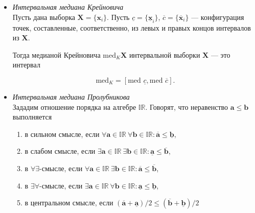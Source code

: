 \documentclass[10pt]{article}
\begin{document}
\begin{itemize}
  \[
    \mathbf{X} = \{ \mathbf{x}_i \}.
  \]

  Сформируем массив интервалов \( \mathbf{z} \) из концов интервалов
  \( \mathbf{X} \).

  Для каждого интервала \( \mathbf{z}_i \) подсчитываем число \( \mu_i \)
  интервалов из выборки \( \mathbf{X}_i \), включающих \( \mathbf{z}_i \).
  Максимальные \( \mu_i = \max \mu \) достигаются для индексного множества
  \( K \). Тогда можно найти интервальную моду как мультиинтервал

  \begin{equation*}
    \text{mode } \mathbf{X} = \bigcup_{k \in K} \mathbf{z}_k.
  \end{equation*}
  
 \item \textit{Интервальная медиана Крейновича}\\
   Пусть дана выборка \( \mathbf{X} = \{ \mathbf{x}_i \} \). Пусть
  \( \underline c = \{ \underline{\mathbf{x}}_i \} \),
  \( \overline c = \{ \overline{\mathbf{x}}_i \} \) --- конфигурация
  точек, составленные, соответственно, из левых и правых концов интервалов
  из \( \mathbf{X} \).

  Тогда медианой Крейновича \( \text{med}_K \mathbf{X} \) интервальной
  выборки \( \mathbf{X} \) --- это интервал

  \begin{equation*}
    \text{med}_K = [\text{med } \underline c, \text{med } \overline c].
  \end{equation*}
  
 \item \textit{Интервальная медиана Пролубникова}\\
    Зададим отношение порядка на алгебре \( \mathbb{IR} \). Говорят, что
  неравенство \( \mathbf{a} \leqslant \mathbf{b} \) выполняется

  \begin{enumerate}
    \item в сильном смысле, если
      \( \forall \mathbf{a} \in \mathbb{IR} \ \forall \mathbf{b} \in \mathbb{IR}: \overline{\mathbf{a}} \leqslant \underline{\mathbf{b}} \),
    \item в слабом смысле, если
      \( \exists \mathbf{a} \in \mathbb{IR} \ \exists \mathbf{b} \in \mathbb{IR}: \underline{\mathbf{a}} \leqslant \overline{\mathbf{b}} \),
    \item в \( \forall \exists \)-смысле, если
      \( \forall \mathbf{a} \in \mathbb{IR} \ \exists \mathbf{b} \in \mathbb{IR}: \overline{\mathbf{a}} \leqslant \overline{\mathbf{b}} \),
    \item в \( \exists \forall \)-смысле, если
      \( \exists \mathbf{a} \in \mathbb{IR} \ \forall \mathbf{b} \in \mathbb{IR}: \underline{\mathbf{a}} \leqslant \underline{\mathbf{b}} \),
    \item в центральном смысле, если
      \( (\overline{\mathbf{a}} + \underline{\mathbf{a}}) / 2 \leqslant (\overline{\mathbf{b}} + \underline{\mathbf{b}}) / 2 \)
  \end{enumerate}


\end{itemize}
\end{document}
